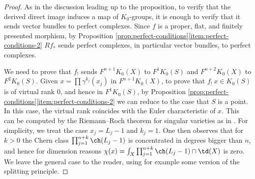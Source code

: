 \begin{proof}
As in the discussion leading up to the proposition, to verify that the derived direct image induces a map of $K_0$-groups, it is enough to verify that it sends vector bundles to perfect complexes. Since $f$ is a proper, flat, and finitely presented morphism, by Proposition \ref{prop:perfect-conditions}\eqref{item:perfect-conditions-2} $Rf_{\ast}$ sends perfect complexes, in particular vector bundles, to perfect complexes.

We need to prove that $f_!$ sends $F^{n+1} K_0(X)$ to $F^1 K_0(S)$ and $F^{n+2} K_0(X)$ to $F^2 K_0(S)$. Given $x=\prod \gamma^{k_j}(x_j)$ in $F^{n+1} K_0(X)$, to prove that $f_!\ x \in K_0(S)$ is of virtual rank 0, and hence in $F^1 K_0(S)$, by Proposition \ref{prop:perfect-conditions}\eqref{item:perfect-conditions-2} we can reduce to the case that $S$ is a point. In this case, the virtual rank coincides with the Euler characteristic of $x$. This can be computed by the Riemann--Roch theorem for singular varieties as in \cite[Cor.\,18.3.1]{Fulton}. For simplicity, we treat the case $x_j = L_j-1$ and $k_j=1$. One then observes that for $k>0$ the Chern class $\prod_{j=1}^{n+k}\ch(L_{j}-1)$ is concentrated in degrees bigger than $n$, and hence for dimension reasons $\chi(x) = \int_{X} \prod_{j=1}^{n+k}\ch(L_{j}-1) \cap \td(X)$ is zero. We leave the general case to the reader, using for example some version of the splitting principle.


\end{proof}
